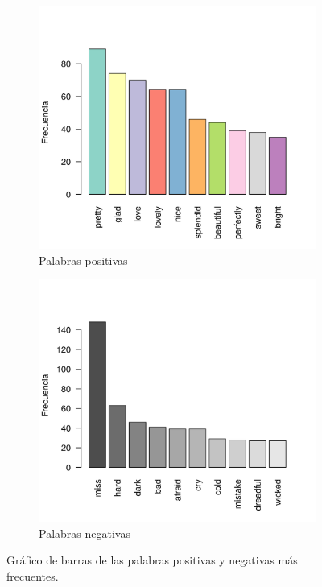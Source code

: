 \documentclass[12pt]{article}
\begin{document}
	\begin{figure}
		\begin{subfigure}{.5\textwidth}
			\centering
			\includegraphics[width = 0.9\linewidth]{palabras_positivas.png}
			\caption{Palabras positivas}
			\label{palabras_positivas}
		\end{subfigure}
		\begin{subfigure}{0.5\textwidth}
			\centering
			\includegraphics[width = 0.9\linewidth]{palabras_negativas.png}
			\caption{Palabras negativas}
			\label{palabras_negativas}
		\end{subfigure}
	
		\caption{Gráfico de barras de las palabras positivas y negativas más frecuentes.}
		\label{palabras_pos-neg}
	\end{figure}
	



\end{document}
